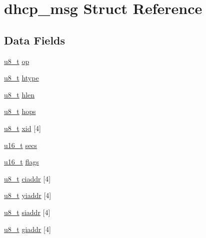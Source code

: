 \hypertarget{structdhcp__msg}{
\section{dhcp\_\-msg Struct Reference}
\label{structdhcp__msg}
}
\subsection*{Data Fields}
\begin{DoxyCompactItemize}
\item 
\hyperlink{group__uipfw_ga4caecabca98b43919dd11be1c0d4cd8e}{u8\_\-t} \hyperlink{structdhcp__msg_aad49609161e8b9b337bc6af49430368b}{op}
\item 
\hyperlink{group__uipfw_ga4caecabca98b43919dd11be1c0d4cd8e}{u8\_\-t} \hyperlink{structdhcp__msg_a5c9e4bb2f8935edecc1a8e33e6a0cf83}{htype}
\item 
\hyperlink{group__uipfw_ga4caecabca98b43919dd11be1c0d4cd8e}{u8\_\-t} \hyperlink{structdhcp__msg_a7520521ffd9f53b79e358f3fd2b4efae}{hlen}
\item 
\hyperlink{group__uipfw_ga4caecabca98b43919dd11be1c0d4cd8e}{u8\_\-t} \hyperlink{structdhcp__msg_acc1bb4e8d3e629e7b6af790329b13682}{hops}
\item 
\hyperlink{group__uipfw_ga4caecabca98b43919dd11be1c0d4cd8e}{u8\_\-t} \hyperlink{structdhcp__msg_a8b0ff8bae8d7e2045af329d8af0eae85}{xid} \mbox{[}4\mbox{]}
\item 
\hyperlink{group__uipfw_ga77570ac4fcab86864fa1916e55676da2}{u16\_\-t} \hyperlink{structdhcp__msg_ab1a8469d961aee2dca25c832f5f0042c}{secs}
\item 
\hyperlink{group__uipfw_ga77570ac4fcab86864fa1916e55676da2}{u16\_\-t} \hyperlink{structdhcp__msg_a5a625add94f828fbbc34f7e77d2458cb}{flags}
\item 
\hyperlink{group__uipfw_ga4caecabca98b43919dd11be1c0d4cd8e}{u8\_\-t} \hyperlink{structdhcp__msg_abc2e31ead334c04b03e115fd6351a2c4}{ciaddr} \mbox{[}4\mbox{]}
\item 
\hyperlink{group__uipfw_ga4caecabca98b43919dd11be1c0d4cd8e}{u8\_\-t} \hyperlink{structdhcp__msg_a292fb4679f1fe8dbf29ca0a17991a6e7}{yiaddr} \mbox{[}4\mbox{]}
\item 
\hyperlink{group__uipfw_ga4caecabca98b43919dd11be1c0d4cd8e}{u8\_\-t} \hyperlink{structdhcp__msg_aa67d35a840892c0586d4201ebb7c83c1}{siaddr} \mbox{[}4\mbox{]}
\item 
\hyperlink{group__uipfw_ga4caecabca98b43919dd11be1c0d4cd8e}{u8\_\-t} \hyperlink{structdhcp__msg_a6ad02bf8a8f27c103b9dea92c55bdfbd}{giaddr} \mbox{[}4\mbox{]}

\end{DoxyCompactItemize}
